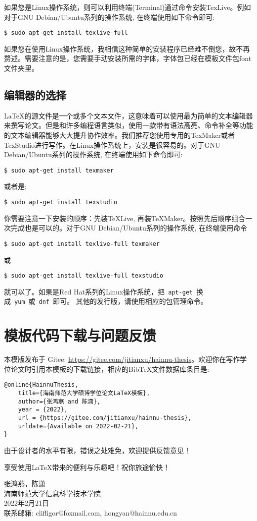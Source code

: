 如果您是Linux操作系统，则可以利用终端(Terminal)通过命令安装TexLive。例如对于GNU Debian/Ubuntu系列的操作系统, 在终端使用如下命令即可:
\begin{lstlisting}[frame=shadowbox]
	$ sudo apt-get install texlive-full
\end{lstlisting}
如果您在使用Linux操作系统，我相信这种简单的安装程序已经难不倒您，故不再赘述。需要注意的是，您需要手动安装所需的字体，字体包已经在模板文件包font文件夹里。

\subsection*{编辑器的选择}
\LaTeX 的源文件是一个或多个文本文件，这意味着可以使用最为简单的文本编辑器来撰写论文。但是和许多编程语言类似，使用一款带有语法高亮、命令补全等功能的文本编辑器能够大大提升协作效率。我们推荐您使用专用的TexMaker或者TexStudio进行写作。在Linux操作系统上，安装是很容易的。对于GNU Debian/Ubuntu系列的操作系统, 在终端使用如下命令即可:
\begin{lstlisting}[frame=shadowbox]
	$ sudo apt-get install texmaker
\end{lstlisting}
或者是:
\begin{lstlisting}[frame=shadowbox]
	$ sudo apt-get install texstudio
\end{lstlisting}
你需要注意一下安装的顺序：先装TeXLive, 再装TeXMaker。按照先后顺序组合一次完成也是可以的。对于GNU Debian/Ubuntu系列的操作系统, 在终端使用命令
\begin{lstlisting}[frame=shadowbox]
	$ sudo apt-get install texlive-full texmaker
\end{lstlisting}
或
\begin{lstlisting}[frame=shadowbox]
	$ sudo apt-get install texlive-full texstudio
\end{lstlisting}
就可以了。如果是Red Hat系列的Linux操作系统，把~\verb|apt-get|~换成~\verb|yum|~或~\verb|dnf|~即可。
其他的发行版，请使用相应的包管理命令。

\newpage

\section*{模板代码下载与问题反馈}

本模版发布于 Gitee: \url{https://gitee.com/jitianxu/hainnu-thesis}。欢迎你在写作学位论文时引用本模板的下载链接，相应的BibTeX文件数据库条目是:
\begin{verbatim}
@online{HainnuThesis,
	title={海南师范大学硕博学位论文LaTeX模板},
	author={张鸿燕 and 陈潇},
	year = {2022},
	url = {https://gitee.com/jitianxu/hainnu-thesis},
	urldate={Available on 2022-02-21},	
}
\end{verbatim}

{由于设计者的水平有限，错误之处难免，欢迎提供反馈意见！}

享受使用{\LaTeX{}}带来的便利与乐趣吧！祝你旅途愉快！

\begin{flushright}
	张鸿燕，陈潇\\
	海南师范大学信息科学技术学院\\
	2022年2月21日\\
	联系邮箱: cliffigor@foxmail.com, hongyan@hainnu.edu.cn
\end{flushright}